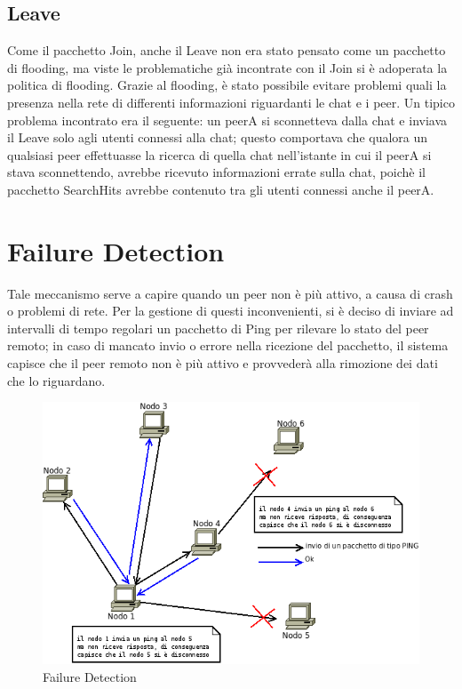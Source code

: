 \subsection{Leave}
Come il pacchetto Join, anche il Leave non era stato pensato come un pacchetto di flooding, ma viste le problematiche già incontrate con il Join si è adoperata la politica di flooding. Grazie al flooding, è stato possibile evitare problemi quali la presenza nella rete di differenti informazioni riguardanti le chat e i peer. Un tipico problema incontrato era il seguente: un peerA si sconnetteva dalla chat e inviava il Leave solo agli utenti connessi alla chat; questo comportava che qualora un qualsiasi peer effettuasse la ricerca di quella chat nell'istante in cui il peerA si stava sconnettendo, avrebbe ricevuto informazioni errate sulla chat, poichè il pacchetto SearchHits avrebbe contenuto tra gli utenti connessi anche il peerA.
\section{Failure Detection}
Tale meccanismo serve a capire quando un peer non è più attivo, a causa di crash o problemi di rete. Per la gestione di questi inconvenienti, si è deciso di inviare ad intervalli di tempo regolari un pacchetto di Ping per rilevare lo stato del peer remoto; in caso di mancato invio o errore nella ricezione del pacchetto, il sistema capisce che il peer remoto non è più attivo e provvederà alla rimozione dei dati che lo riguardano.
\begin{figure}[H]
\begin{center}
\includegraphics[scale=0.5]{etc/failure_detection.png}
\caption{Failure Detection}
\label{failuredetection}
\end{center}
\end{figure}

